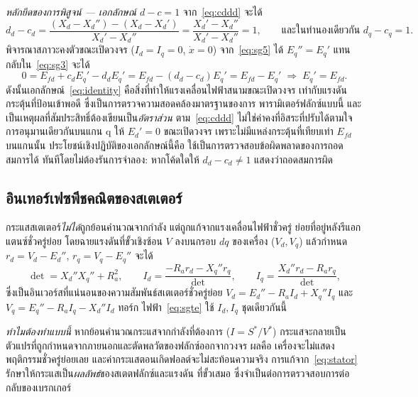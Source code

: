 \documentclass[12pt,a4paper]{article}
\begin{document}
\emph{หลักยึดของการพิสูจน์ --- เอกลักษณ์ $d-c=1$}
จาก~\eqref{eq:cddd} จะได้
\begin{equation}
  d_d-c_d=\frac{(X_d-X_d'')-(X_d-X_d')}{X_d'-X_d''}
         =\frac{X_d'-X_d''}{X_d'-X_d''}=1,
  \qquad\text{และในทำนองเดียวกัน } d_q-c_q=1.
  \label{eq:identity}
\end{equation}
พิจารณาสภาวะคงตัวขณะเปิดวงจร ($I_d=I_q=0$, $\dot x=0$) จาก~\eqref{eq:sg5} ได้
$E_q''=E_q'$ แทนกลับใน~\eqref{eq:sg3} จะได้
\begin{equation}
  0=E_{fd}+c_d E_q'-d_d E_q'=E_{fd}-(d_d-c_d)E_q'=E_{fd}-E_q'
  \;\Longrightarrow\; E_q'=E_{fd}.
\end{equation}
ดังนั้นเอกลักษณ์~\eqref{eq:identity} คือสิ่งที่ทำให้แรงเคลื่อนไฟฟ้าสนามขณะเปิดวงจร
เท่ากับแรงดันกระตุ้นที่ป้อนเข้าพอดี ซึ่งเป็นการตรวจความสอดคล้องมาตรฐานของการ
พารามิเตอร์ฟลักซ์แบบนี้ และเป็นเหตุผลที่สัมประสิทธิ์ต้องเขียนเป็น\emph{อัตราส่วน}
ตาม~\eqref{eq:cddd} ไม่ใช่ค่าคงที่อิสระที่ปรับได้ตามใจ การอนุมานเดียวกันบนแกน q
ให้ $E_d'=0$ ขณะเปิดวงจร เพราะไม่มีแหล่งกระตุ้นที่เทียบเท่า $E_{fd}$ บนแกนนั้น
ประโยชน์เชิงปฏิบัติของเอกลักษณ์นี้คือ ใช้เป็นการตรวจสอบข้อผิดพลาดของการถอดสมการได้
ทันทีโดยไม่ต้องรันการจำลอง: หากโค้ดใดให้ $d_d-c_d\ne1$ แสดงว่าถอดสมการผิด

\subsection{อินเทอร์เฟซพีชคณิตของสเตเตอร์}
กระแสสเตเตอร์\emph{ไม่ได้}ถูกย้อนคำนวณจากกำลัง แต่ถูกแก้จากแรงเคลื่อนไฟฟ้าชั่วครู่
ย่อยที่อยู่หลังรีแอกแตนซ์ชั่วครู่ย่อย โดยฉายแรงดันที่ขั้วเชิงซ้อน $V$ ลงบนกรอบ $dq$
ของเครื่อง ($V_d,V_q$) แล้วกำหนด $r_d=V_d-E_d''$, $r_q=V_q-E_q''$ จะได้
\begin{equation}
  \det=X_d''X_q''+R_a^2,\qquad
  I_d=\frac{-R_a r_d - X_q'' r_q}{\det},\qquad
  I_q=\frac{X_d'' r_d - R_a r_q}{\det},
  \label{eq:stator}
\end{equation}
ซึ่งเป็นอินเวอร์สที่แน่นอนของความสัมพันธ์สเตเตอร์ชั่วครู่ย่อย
$V_d=E_d''-R_a I_d+X_q'' I_q$ และ $V_q=E_q''-R_a I_q-X_d'' I_d$ ทอร์ก
ไฟฟ้า~\eqref{eq:sgte} ใช้ $I_d,I_q$ ชุดเดียวกันนี้

\emph{ทำไมต้องทำแบบนี้} หากย้อนคำนวณกระแสจากกำลังที่ต้องการ ($I=S^{*}/V^{*}$)
กระแสจะกลายเป็นตัวแปรที่ถูกกำหนดจากภายนอกและตัดพลวัตของฟลักซ์ออกจากวงจร ผลคือ
เครื่องจะไม่แสดงพฤติกรรมชั่วครู่ย่อยเลย และค่ากระแสตอนเกิดฟอลต์จะไม่สะท้อนความจริง
การแก้จาก~\eqref{eq:stator} รักษาให้กระแสเป็น\emph{ผลลัพธ์}ของสเตตฟลักซ์และแรงดัน
ที่ขั้วเสมอ ซึ่งจำเป็นต่อการตรวจสอบการต่อกลับของเบรกเกอร์
\end{document}
